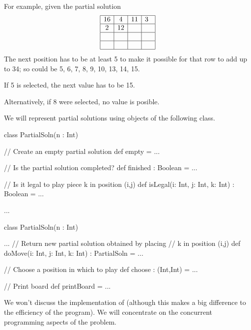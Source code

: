
\begin{selfnote}

For example, given the partial solution
\[
\begin{array}{|c|c|c|c|}
\hline
16 & 4 & 11 & 3\;\:  \\\hline
2 & 12 &  &   \\\hline
 &  &  &   \\\hline
&  &  &  \\ \hline
\end{array}
\]
The next position has to be at least 5 to make it possible for that row to add
up to 34; so could be 5, 6, 7, 8, 9, 10, 13, 14, 15.

If 5 is selected, the next value has to be 15.

Alternatively, if 8 were selected, no value is posible.
\end{selfnote}


\begin{slide}

We will represent partial solutions using objects of the following class.
%
\begin{scala}
class PartialSoln(n : Int){
  // Create an empty partial solution
  def empty = {...} 

  // Is the partial solution completed?
  def finished : Boolean = {...} 

  // Is it legal to play piece k in position (i,j)
  def isLegal(i: Int, j: Int, k: Int) : Boolean = {...}

  ...
}
\end{scala}
\end{slide}


\begin{slide}

\begin{scala}
class PartialSoln(n : Int){ ...
  // Return new partial solution obtained by placing 
  // k in position (i,j)
  def doMove(i: Int, j: Int, k: Int) : PartialSoln = {...}

  // Choose a position in which to play
  def choose : (Int,Int) = {...}

  // Print board
  def printBoard = {...}
}
\end{scala}

We won't discuss the implementation of  (although this
makes a big difference to the efficiency of the program).  We will concentrate
on the concurrent programming aspects of the problem. 
\end{slide}

